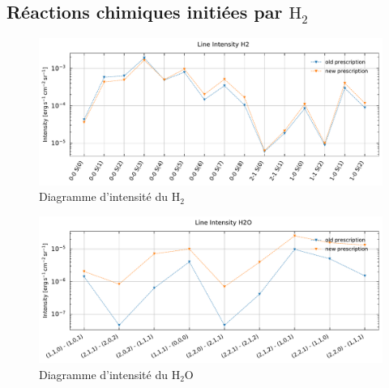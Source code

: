 \begin{appendices}
\clearpage
\section{Réactions chimiques initiées par $\mathrm{H}_2$}
\label{appendix:type46}
\begin{figure}[!h]
    \centering \includegraphics[trim = {0 0 0 1cm},clip,width=1\textwidth]{figure/type46/I_comp_H2.pdf}
    \caption{Diagramme d'intensité du $\mathrm{H}_2$}
    \begin{minipage}{\textwidth}
    
    \end{minipage}
    \label{fig:type46:H2}
\end{figure}

\begin{figure}[!h]
    \centering \includegraphics[trim = {0 0 0 1cm},clip,width=1\textwidth]{figure/type46/I_comp_H2O.pdf}
    \caption{Diagramme d'intensité du $\mathrm{H}_2\mathrm{O}$}
    \begin{minipage}{\textwidth}
  
    \end{minipage}
    \label{fig:type46:H2O}
\end{figure}


\end{appendices}
